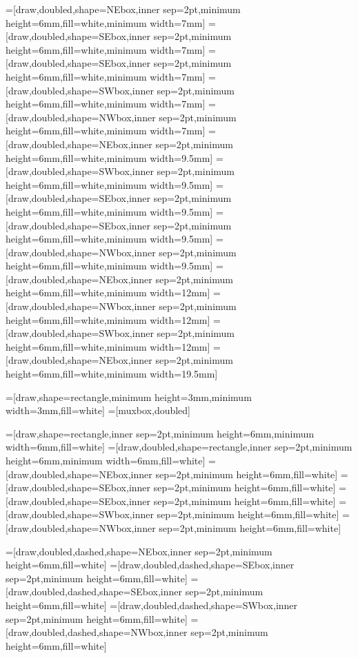 =[draw,doubled,shape=NEbox,inner sep=2pt,minimum height=6mm,fill=white,minimum width=7mm]
=[draw,doubled,shape=SEbox,inner sep=2pt,minimum height=6mm,fill=white,minimum width=7mm]
=[draw,doubled,shape=SEbox,inner sep=2pt,minimum height=6mm,fill=white,minimum width=7mm]
=[draw,doubled,shape=SWbox,inner sep=2pt,minimum height=6mm,fill=white,minimum width=7mm]
=[draw,doubled,shape=NWbox,inner sep=2pt,minimum height=6mm,fill=white,minimum width=7mm]
=[draw,doubled,shape=NEbox,inner sep=2pt,minimum height=6mm,fill=white,minimum width=9.5mm]
=[draw,doubled,shape=SWbox,inner sep=2pt,minimum height=6mm,fill=white,minimum width=9.5mm]
=[draw,doubled,shape=SEbox,inner sep=2pt,minimum height=6mm,fill=white,minimum width=9.5mm]
=[draw,doubled,shape=SEbox,inner sep=2pt,minimum height=6mm,fill=white,minimum width=9.5mm]
=[draw,doubled,shape=NWbox,inner sep=2pt,minimum height=6mm,fill=white,minimum width=9.5mm]
=[draw,doubled,shape=NEbox,inner sep=2pt,minimum height=6mm,fill=white,minimum width=12mm]
=[draw,doubled,shape=NWbox,inner sep=2pt,minimum height=6mm,fill=white,minimum width=12mm]
=[draw,doubled,shape=SWbox,inner sep=2pt,minimum height=6mm,fill=white,minimum width=12mm]
=[draw,doubled,shape=NEbox,inner sep=2pt,minimum height=6mm,fill=white,minimum width=19.5mm]

=[draw,shape=rectangle,minimum height=3mm,minimum width=3mm,fill=white]
=[muxbox,doubled]

=[draw,shape=rectangle,inner sep=2pt,minimum height=6mm,minimum width=6mm,fill=white]
=[draw,doubled,shape=rectangle,inner sep=2pt,minimum height=6mm,minimum width=6mm,fill=white]
=[draw,doubled,shape=NEbox,inner sep=2pt,minimum height=6mm,fill=white]
=[draw,doubled,shape=SEbox,inner sep=2pt,minimum height=6mm,fill=white]
=[draw,doubled,shape=SEbox,inner sep=2pt,minimum height=6mm,fill=white]
=[draw,doubled,shape=SWbox,inner sep=2pt,minimum height=6mm,fill=white]
=[draw,doubled,shape=NWbox,inner sep=2pt,minimum height=6mm,fill=white]

=[draw,doubled,dashed,shape=NEbox,inner sep=2pt,minimum height=6mm,fill=white]
=[draw,doubled,dashed,shape=SEbox,inner sep=2pt,minimum height=6mm,fill=white]
=[draw,doubled,dashed,shape=SEbox,inner sep=2pt,minimum height=6mm,fill=white]
=[draw,doubled,dashed,shape=SWbox,inner sep=2pt,minimum height=6mm,fill=white]
=[draw,doubled,dashed,shape=NWbox,inner sep=2pt,minimum height=6mm,fill=white]

